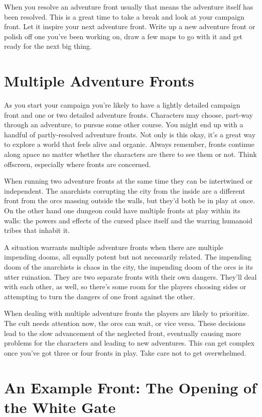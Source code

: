  When you resolve an adventure front usually that means the adventure itself has been resolved. This is a great time to take a break and look at your campaign front. Let it inspire your next adventure front. Write up a new adventure front or polish off one you've been working on, draw a few maps to go with it and get ready for the next big thing.
\section{Multiple Adventure Fronts}


 As you start your campaign you're likely to have a lightly detailed campaign front and one or two detailed adventure fronts. Characters may choose, part-way through an adventure, to pursue some other course. You might end up with a handful of partly-resolved adventure fronts. Not only is this okay, it's a great way to explore a world that feels alive and organic. Always remember, fronts continue along apace no matter whether the characters are there to see them or not. Think offscreen, especially where fronts are concerned.


 When running two adventure fronts at the same time they can be intertwined or independent. The anarchists corrupting the city from the inside are a different front from the orcs massing outside the walls, but they'd both be in play at once. On the other hand one dungeon could have multiple fronts at play within its walls: the powers and effects of the cursed place itself and the warring humanoid tribes that inhabit it.


 A situation warrants multiple adventure fronts when there are multiple impending dooms, all equally potent but not necessarily related. The impending doom of the anarchists is chaos in the city, the impending doom of the orcs is its utter ruination. They are two separate fronts with their own dangers. They'll deal with each other, as well, so there's some room for the players choosing sides or attempting to turn the dangers of one front against the other.


 When dealing with multiple adventure fronts the players are likely to prioritize. The cult needs attention now, the orcs can wait, or vice versa. These decisions lead to the slow advancement of the neglected front, eventually causing more problems for the characters and leading to new adventures. This can get complex once you've got three or four fronts in play. Take care not to get overwhelmed.
\section{An Example Front: The Opening of the White Gate}
